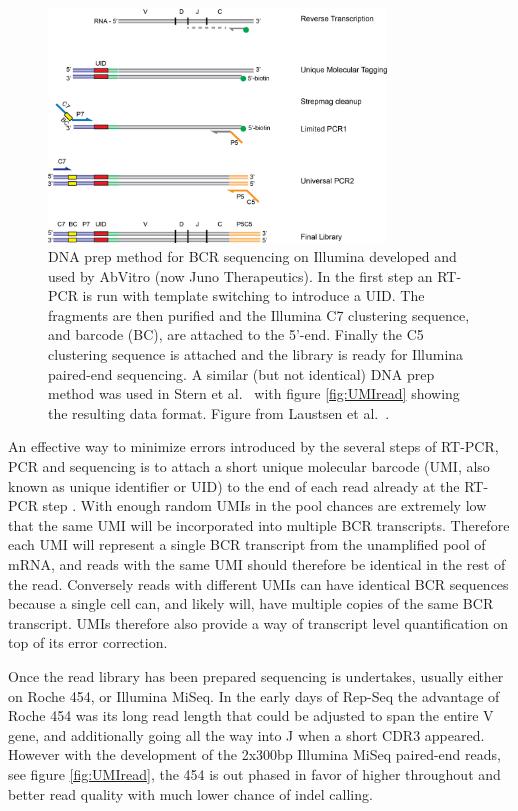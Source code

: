 \begin{figure}[ht]
    \centering
    \includegraphics[width=0.8\textwidth]{figures/BCR_RTPCR_AbVitro.png}
    \caption{
        \label{fig:BCR_RTPCR}
        DNA prep method for BCR sequencing on Illumina developed and used by AbVitro (now Juno Therapeutics).
        In the first step an RT-PCR is run with template switching to introduce a UID.
        The fragments are then purified and the Illumina C7 clustering sequence, and barcode (BC), are attached to the 5'-end.
        Finally the C5 clustering sequence is attached and the library is ready for Illumina paired-end sequencing.
        A similar (but not identical) DNA prep method was used in Stern et al.\ \cite{stern2014b} with figure \ref{fig:UMIread} showing the resulting data format.
        Figure from Laustsen et al.\ \cite{laustsen2017exploration}.
    }
\end{figure}

An effective way to minimize errors introduced by the several steps of RT-PCR, PCR and sequencing is to attach a short unique molecular barcode (UMI, also known as unique identifier or UID) to the end of each read already at the RT-PCR step \cite{turchaninova2016high}.
With enough random UMIs in the pool chances are extremely low that the same UMI will be incorporated into multiple BCR transcripts.
Therefore each UMI will represent a single BCR transcript from the unamplified pool of mRNA, and reads with the same UMI should therefore be identical in the rest of the read.
Conversely reads with different UMIs can have identical BCR sequences because a single cell can, and likely will, have multiple copies of the same BCR transcript.
UMIs therefore also provide a way of transcript level quantification on top of its error correction.

Once the read library has been prepared sequencing is undertakes, usually either on Roche 454, or Illumina MiSeq.
In the early days of Rep-Seq the advantage of Roche 454 was its long read length that could be adjusted to span the entire V gene, and additionally going all the way into J when a short CDR3 appeared.
However with the development of the 2x300bp Illumina MiSeq paired-end reads, see figure \ref{fig:UMIread}, the 454 is out phased in favor of higher throughout and better read quality with much lower chance of indel calling.

